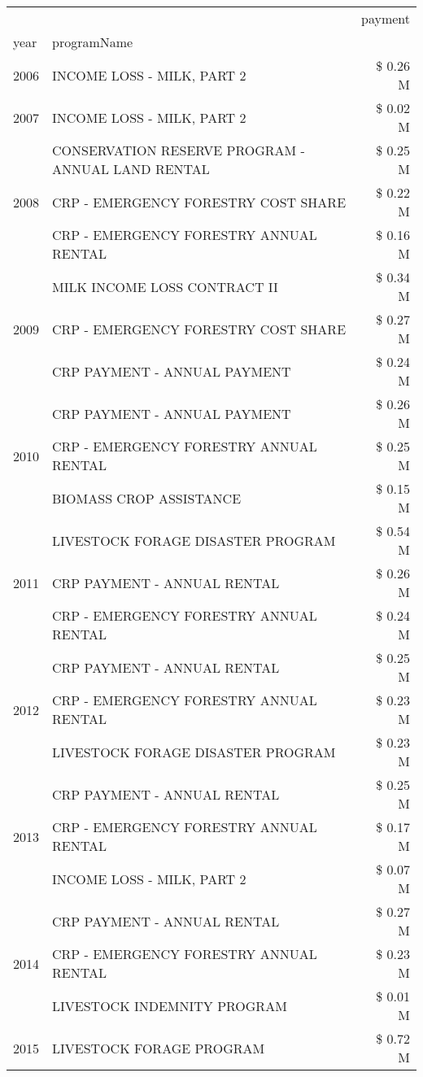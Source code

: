 \begin{tabular}{llr}
\toprule
 &  & payment \\
year & programName &  \\
\midrule
2006 & INCOME LOSS - MILK, PART 2 & \$ 0.26 M \\
\cline{1-3}
2007 & INCOME LOSS - MILK, PART 2 & \$ 0.02 M \\
\cline{1-3}
\multirow[t]{3}{*}{2008} & CONSERVATION RESERVE PROGRAM - ANNUAL LAND RENTAL & \$ 0.25 M \\
 & CRP - EMERGENCY FORESTRY COST SHARE & \$ 0.22 M \\
 & CRP - EMERGENCY FORESTRY ANNUAL RENTAL & \$ 0.16 M \\
\cline{1-3}
\multirow[t]{3}{*}{2009} & MILK INCOME LOSS CONTRACT II & \$ 0.34 M \\
 & CRP - EMERGENCY FORESTRY COST SHARE & \$ 0.27 M \\
 & CRP PAYMENT - ANNUAL PAYMENT & \$ 0.24 M \\
\cline{1-3}
\multirow[t]{3}{*}{2010} & CRP PAYMENT - ANNUAL PAYMENT & \$ 0.26 M \\
 & CRP - EMERGENCY FORESTRY ANNUAL RENTAL & \$ 0.25 M \\
 & BIOMASS CROP ASSISTANCE & \$ 0.15 M \\
\cline{1-3}
\multirow[t]{3}{*}{2011} & LIVESTOCK FORAGE DISASTER PROGRAM & \$ 0.54 M \\
 & CRP PAYMENT - ANNUAL RENTAL & \$ 0.26 M \\
 & CRP - EMERGENCY FORESTRY ANNUAL RENTAL & \$ 0.24 M \\
\cline{1-3}
\multirow[t]{3}{*}{2012} & CRP PAYMENT - ANNUAL RENTAL & \$ 0.25 M \\
 & CRP - EMERGENCY FORESTRY ANNUAL RENTAL & \$ 0.23 M \\
 & LIVESTOCK FORAGE DISASTER PROGRAM & \$ 0.23 M \\
\cline{1-3}
\multirow[t]{3}{*}{2013} & CRP PAYMENT - ANNUAL RENTAL & \$ 0.25 M \\
 & CRP - EMERGENCY FORESTRY ANNUAL RENTAL & \$ 0.17 M \\
 & INCOME LOSS - MILK, PART 2 & \$ 0.07 M \\
\cline{1-3}
\multirow[t]{3}{*}{2014} & CRP PAYMENT - ANNUAL RENTAL & \$ 0.27 M \\
 & CRP - EMERGENCY FORESTRY ANNUAL RENTAL & \$ 0.23 M \\
 & LIVESTOCK INDEMNITY PROGRAM & \$ 0.01 M \\
\cline{1-3}
\multirow[t]{3}{*}{2015} & LIVESTOCK FORAGE PROGRAM & \$ 0.72 M \\

\end{tabular}
